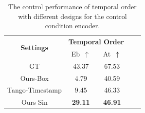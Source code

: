\documentclass[letterpaper]{article} %
\begin{document}
\begin{table}[!h]\footnotesize
    \centering
    \caption{The control performance of temporal order with different designs for the control condition encoder.}
    \label{tab:ablation control condition encoder}
        \begin{tabular}{c|cccc}
        \toprule
        \multirow{2}{*}{\textbf{Settings}} & \multicolumn{2}{c}{\textbf{Temporal Order}} \\
         & Eb~$\uparrow$ & At~$\uparrow$  \\
        \midrule
        \midrule
         GT & 43.37 & 67.53\\
         \midrule
         Ours-Box & 4.79 & 40.59 \\
         Tango-Timestamp & 9.45 & 46.33 \\
         Ours-Sin & \textbf{29.11} & \textbf{46.91} \\
        \bottomrule
        \end{tabular}
\end{table}
\end{document}
